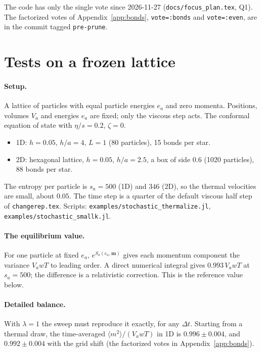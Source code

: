\documentclass[11pt,aps,preprint,nofootinbib,superscriptaddress,tightenlines]{revtex4-2}
\def\App#1{Appendix~\ref{#1}}
\newcommand{\avg}[1]{\langle #1\rangle}
\let\oldparagraph\paragraph
\renewcommand{\paragraph}{\par\bigskip\oldparagraph}
\begin{document}
\noindent The code has only the single vote since 2026-11-27 (\nolinkurl{docs/focus_plan.tex}, Q1).  The factorized votes of
\App{app:bonds}, \texttt{vote=:bonds} and \texttt{vote=:even}, are in the commit tagged \texttt{pre-prune}.

\section{Tests on a frozen lattice}
\label{sec:tests}

\paragraph{Setup.}  A lattice of particles with equal particle energies $e_a$
and zero momenta.  Positions, volumes $V_a$ and energies $e_a$ are fixed; only the
viscous step acts.  The conformal equation of state with $\eta/s=0.2$, $\zeta=0$.
\begin{itemize}
\item 1D: $h=0.05$, $h/a=4$, $L=1$ (80 particles), 15 bonds per star.
\item 2D: hexagonal lattice, $h=0.05$, $h/a=2.5$, a box of side $0.6$ (1020
  particles), 88 bonds per star.
\end{itemize}
The entropy per particle is $s_a=500$ (1D) and $346$ (2D), so the thermal
velocities are small, about $0.05$.  The time step is a quarter of the default
viscous half step of \texttt{changerep.tex}.  Scripts:
\texttt{examples/stochastic\_thermalize.jl}, \texttt{examples/stochastic\_smallk.jl}.

\paragraph{The equilibrium value.}  For one particle at fixed $e_a$, $e^{S_a(e_a,\bm m)}$
gives each momentum component the variance $V_awT$ to leading order.  A direct
numerical integral gives $0.993\,V_awT$ at $s_a=500$; the difference is a
relativistic correction.  This is the reference value below.

\paragraph{Detailed balance.}  With $\lambda=1$ the sweep must reproduce it
exactly, for any $\Delta t$.  Starting from a thermal draw, the time-averaged
$\avg{m^2}/(V_awT)$ in 1D is $0.996\pm0.004$, and $0.992\pm0.004$ with the grid
shift (the factorized votes in \App{app:bonds}).
\end{document}
